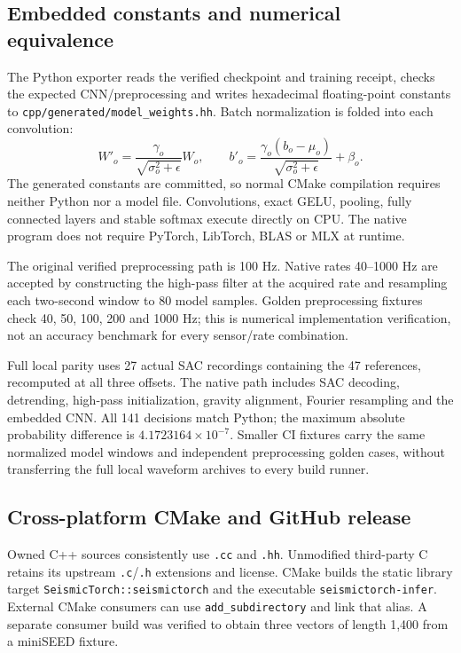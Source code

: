 \documentclass[a4paper,11pt,oneside]{article}
\newcommand{\code}[1]{\nolinkurl{#1}}
\begin{document}
\subsection{Embedded constants and numerical equivalence}
The Python exporter reads the verified checkpoint and training receipt,
checks the expected CNN/preprocessing and writes hexadecimal floating-point
constants to \code{cpp/generated/model_weights.hh}. Batch normalization is
folded into each convolution:
\begin{equation}
 W'_o=\frac{\gamma_o}{\sqrt{\sigma_o^2+\epsilon}}W_o,\qquad
 b'_o=\frac{\gamma_o(b_o-\mu_o)}{\sqrt{\sigma_o^2+\epsilon}}+\beta_o.
\end{equation}
The generated constants are committed, so normal CMake compilation requires
neither Python nor a model file. Convolutions, exact GELU, pooling, fully
connected layers and stable softmax execute directly on CPU. The native
program does not require PyTorch, LibTorch, BLAS or MLX at runtime.

The original verified preprocessing path is 100 Hz. Native rates 40--1000 Hz
are accepted by constructing the high-pass filter at the acquired rate and
resampling each two-second window to 80 model samples. Golden preprocessing
fixtures check 40, 50, 100, 200 and 1000 Hz; this is numerical implementation
verification, not an accuracy benchmark for every sensor/rate combination.

Full local parity uses 27 actual SAC recordings containing the 47 references,
recomputed at all three offsets. The native path includes SAC decoding,
detrending, high-pass initialization, gravity alignment, Fourier resampling
and the embedded CNN. All 141 decisions match Python; the maximum absolute
probability difference is $4.1723164\times10^{-7}$. Smaller CI fixtures carry
the same normalized model windows and independent preprocessing golden cases,
without transferring the full local waveform archives to every build runner.

\subsection{Cross-platform CMake and GitHub release}
Owned C++ sources consistently use \code{.cc} and \code{.hh}. Unmodified
third-party C retains its upstream \code{.c}/\code{.h} extensions and license.
CMake builds the static library target \code{SeismicTorch::seismictorch} and
the executable \code{seismictorch-infer}. External CMake consumers can use
\code{add_subdirectory} and link that alias. A separate consumer build was
verified to obtain three vectors of length 1,400 from a miniSEED fixture.
\end{document}
